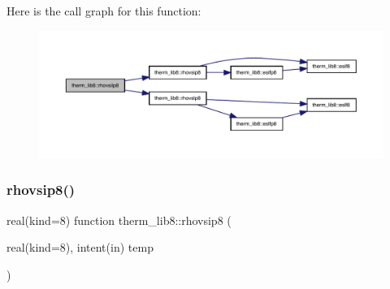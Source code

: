 Here is the call graph for this function\+:
\nopagebreak
\begin{figure}[H]
\begin{center}
\leavevmode
\includegraphics[width=350pt]{namespacetherm__lib8_a3700047f1dd386e992cb13e626018656_cgraph}
\end{center}
\end{figure}
\mbox{\label{namespacetherm__lib8_a9ad0dba1a5ff870a6a36cd06835e8e15}} 
\subsubsection{\texorpdfstring{rhovsip8()}{rhovsip8()}}
{\footnotesize\ttfamily real(kind=8) function therm\+\_\+lib8\+::rhovsip8 (\begin{DoxyParamCaption}\item[{real(kind=8), intent(in)}]{temp }\end{DoxyParamCaption})}

